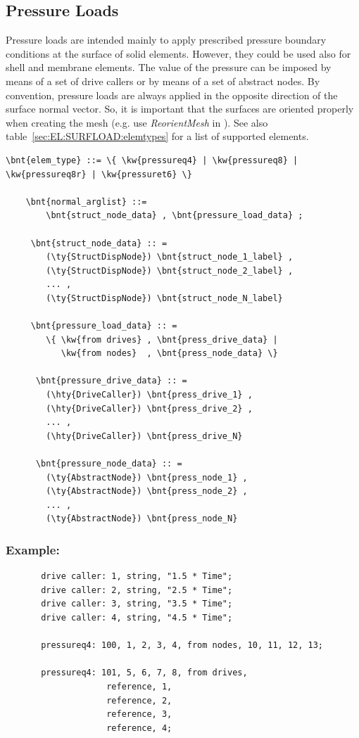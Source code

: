 \subsection{Pressure Loads}
Pressure loads are intended mainly to apply prescribed pressure boundary conditions at the surface of solid elements.
However, they could be used also for shell and membrane elements. The value of the pressure can be imposed
by means of a set of drive callers or by means of a set of abstract nodes. By convention, pressure loads are always applied
in the opposite direction of the surface normal vector. So, it is important that the surfaces are oriented properly
when creating the mesh (e.g. use \emph{ReorientMesh} in ).
See also table~\ref{sec:EL:SURFLOAD:elemtypes} for a list of supported elements.
\begin{Verbatim}[commandchars=\\\{\}]
  \bnt{elem_type} ::= \{ \kw{pressureq4} | \kw{pressureq8} | \kw{pressureq8r} | \kw{pressuret6} \}

    \bnt{normal_arglist} ::=
        \bnt{struct_node_data} , \bnt{pressure_load_data} ;

     \bnt{struct_node_data} :: =
        (\ty{StructDispNode}) \bnt{struct_node_1_label} ,
        (\ty{StructDispNode}) \bnt{struct_node_2_label} ,
        ... ,
        (\ty{StructDispNode}) \bnt{struct_node_N_label}

     \bnt{pressure_load_data} :: =
        \{ \kw{from drives} , \bnt{press_drive_data} |
           \kw{from nodes}  , \bnt{press_node_data} \}

      \bnt{pressure_drive_data} :: =
        (\hty{DriveCaller}) \bnt{press_drive_1} ,
        (\hty{DriveCaller}) \bnt{press_drive_2} ,
        ... ,
        (\hty{DriveCaller}) \bnt{press_drive_N}

      \bnt{pressure_node_data} :: =
        (\ty{AbstractNode}) \bnt{press_node_1} ,
        (\ty{AbstractNode}) \bnt{press_node_2} ,
        ... ,
        (\ty{AbstractNode}) \bnt{press_node_N}

\end{Verbatim}

\subsubsection{Example:}
\begin{verbatim}
       drive caller: 1, string, "1.5 * Time";
       drive caller: 2, string, "2.5 * Time";
       drive caller: 3, string, "3.5 * Time";
       drive caller: 4, string, "4.5 * Time";

       pressureq4: 100, 1, 2, 3, 4, from nodes, 10, 11, 12, 13;

       pressureq4: 101, 5, 6, 7, 8, from drives,
                    reference, 1,
                    reference, 2,
                    reference, 3,
                    reference, 4;
\end{verbatim}

